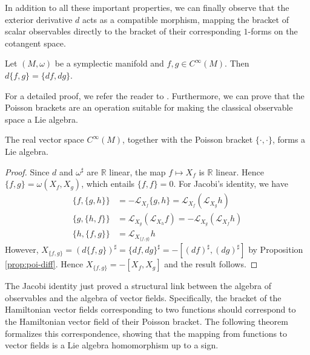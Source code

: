 In addition to all these important properties, we can finally observe that the exterior derivative $d$ acts as a compatible morphism, mapping the bracket of scalar observables directly to the bracket of their corresponding $1$-forms on the cotangent space. 

\begin{proposition}\label{prop:poi-diff}
	Let $(M, \omega)$ be a symplectic manifold and $f, g \in C^\infty(M)$. Then $d\{f, g\} = \{df, dg\}$.
\end{proposition}

\noindent For a detailed proof, we refer the reader to \cite[Proposition 3.3.16]{abrahamFoundationsMechanics2008}. Furthermore, we can prove that the Poisson brackets are an operation suitable for making the classical observable space a Lie algebra.

\begin{proposition}
	The real vector space $ C^\infty(M)$, together with the Poisson bracket $\{\cdot, \cdot\}$, forms a Lie algebra.
\end{proposition}

\begin{proof}
	Since $d$ and $\omega^\sharp$ are $\mathbb{R}$ linear, the map $f \mapsto X_f$ is $\mathbb{R}$ linear. Hence $\{f, g\} = \omega(X_f, X_g)$, which entails $\{f, f\} = 0$. For Jacobi's identity, we have
	\begin{align*}
		\{f, \{g, h\}\} &= - \mathscr{L}_{X_f} \{g, h\} =  \mathscr{L}_{X_f}( \mathscr{L}_{X_g} h) \\
		\{g, \{h, f\}\} &=  \mathscr{L}_{X_g} ( \mathscr{L}_{X_h} f) = - \mathscr{L}_{X_g} ( \mathscr{L}_{X_f} h) \\
		\{h, \{f, g\}\} &=  \mathscr{L}_{X_{\{f, g\}}} h
	\end{align*}
	However, $X_{\{f, g\}} = (d\{f, g\})^\sharp = \{df, dg\}^\sharp = -[(df)^\sharp, (dg)^\sharp]$ by Proposition \ref{prop:poi-diff}. Hence $X_{\{f, g\}} = -[X_f, X_g]$ and the result follows.
\end{proof}

The Jacobi identity just proved a structural link between the algebra of observables and the algebra of vector fields. Specifically, the bracket of the Hamiltonian vector fields corresponding to two functions should correspond to the Hamiltonian vector field of their Poisson bracket. The following theorem formalizes this correspondence, showing that the mapping from functions to vector fields is a Lie algebra homomorphism up to a sign.

